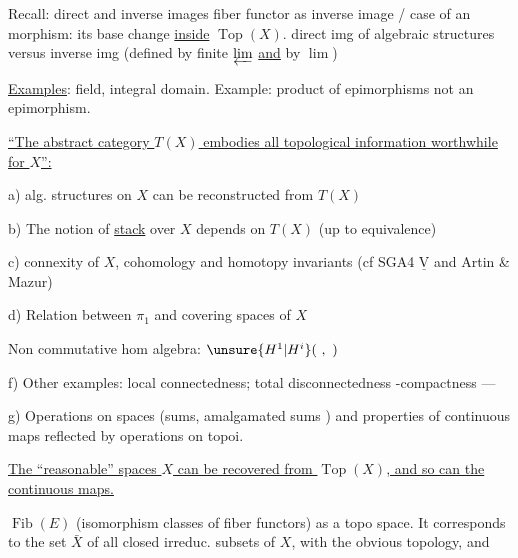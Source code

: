 Recall: direct and inverse images
 fiber functor as inverse image / case of an  morphism:
its base change \uline{inside} $\operatorname{Top}(X)$.
direct img of  algebraic structures versus inverse img
(defined by finite $\varprojlim$ \uline{and} by \uline{$\lim$})



\uline{Examples}: field, integral domain.
Example: product of epimorphisms not an epimorphism.

\uline{``The abstract category $T(X)$ embodies all topological information worthwhile for $X$'':}

a)   alg. structures on $X$ can be reconstructed from $T(X)$

b) The notion of \uline{stack} over $X$ depends on $T(X)$ 
(up to equivalence)

c) connexity of $X$,  cohomology and homotopy
invariants (cf SGA4 $\underline{\mathrm V}$ and Artin \& Mazur)

d) Relation between $\pi_1$ and covering spaces of $X$

 Non commutative hom algebra: $\unsure{H^1|H^i}(\ ,\ )$

f) Other examples: local connectedness; total disconnectedness
-compactness ---

g) Operations on spaces (sums, amalgamated sums \inserted{---})
and properties of  continuous maps reflected
by operations on topoi.

\uline{The ``reasonable'' spaces $X$ can be recovered from $\operatorname{Top}(X)$, and so can the continuous maps.}


$\operatorname{Fib}(E)$ (isomorphism classes of  fiber functors) as a
topo space. It corresponds to the set $\bar X$ of
all closed irreduc. subsets of $X$, with the
obvious topology, and

